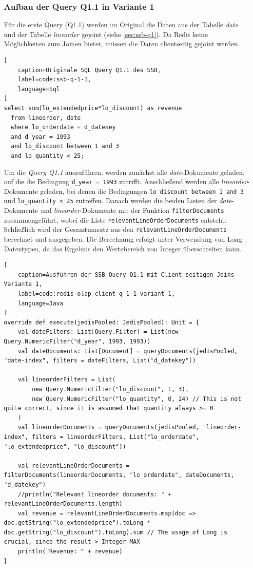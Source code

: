\subsubsection{Aufbau der Query Q1.1 in Variante 1}
Für die erste Query (Q1.1) werden im Original die Daten aus der Tabelle \emph{date} und der Tabelle \emph{lineorder} gejoint (siehe \cref{sec:ssb-q1}). Da Redis keine Möglichkeiten zum Joinen bietet, müssen die Daten clientseitig gejoint werden.

\begin{lstlisting}[
    caption=Originale SQL Query Q1.1 des SSB,
    label=code:ssb-q-1-1,
    language=Sql
]
select sum(lo_extendedprice*lo_discount) as revenue
  from lineorder, date
  where lo_orderdate = d_datekey
  and d_year = 1993
  and lo_discount between 1 and 3
  and lo_quantity < 25;
\end{lstlisting}





Um die \emph{Query Q1.1} auszuführen, werden zunächst alle \emph{date}-Dokumente geladen, auf die die Bedingung \lstinline|d_year = 1993| zutrifft.
Anschließend werden alle \emph{lineorder}-Do\-ku\-men\-te geladen, bei denen die Bedingungen \lstinline|lo_discount between 1 and 3| und \lstinline|lo_quantity < 25| zutreffen.
Danach werden die beiden Listen der \emph{date}-Dokumente und \emph{lineorder}-Dokumente mit der Funktion \lstinline|filterDocuments| zusammengeführt, wobei die Liste \lstinline|relevantLineOrderDocuments| entsteht.
Schließlich wird der Ge\-samt\-um\-satz aus den \lstinline|relevantLineOrderDocuments| berechnet und ausgegeben. Die Berechnung erfolgt unter Verwendung von Long-Datentypen, da das Ergebnis den Wertebereich von Integer überschreiten kann.

\begin{lstlisting}[
    caption=Ausführen der SSB Query Q1.1 mit Client-seitigen Joins Variante 1,
    label=code:redis-olap-client-q-1-1-variant-1,
    language=Java
]
override def execute(jedisPooled: JedisPooled): Unit = {
	val dateFilters: List[Query.Filter] = List(new Query.NumericFilter("d_year", 1993, 1993))
	val dateDocuments: List[Document] = queryDocuments(jedisPooled, "date-index", filters = dateFilters, List("d_datekey"))

	val lineorderFilters = List(
		new Query.NumericFilter("lo_discount", 1, 3),
		new Query.NumericFilter("lo_quantity", 0, 24) // This is not quite correct, since it is assumed that quantity always >= 0
	)
	val lineorderDocuments = queryDocuments(jedisPooled, "lineorder-index", filters = lineorderFilters, List("lo_orderdate", "lo_extendedprice", "lo_discount"))

	val relevantLineOrderDocuments = filterDocuments(lineorderDocuments, "lo_orderdate", dateDocuments, "d_datekey")
	//println("Relevant lineorder documents: " + relevantLineOrderDocuments.length)
	val revenue = relevantLineOrderDocuments.map(doc => doc.getString("lo_extendedprice").toLong * doc.getString("lo_discount").toLong).sum // The usage of Long is crucial, since the result > Integer MAX
	println("Revenue: " + revenue)
}
\end{lstlisting}


